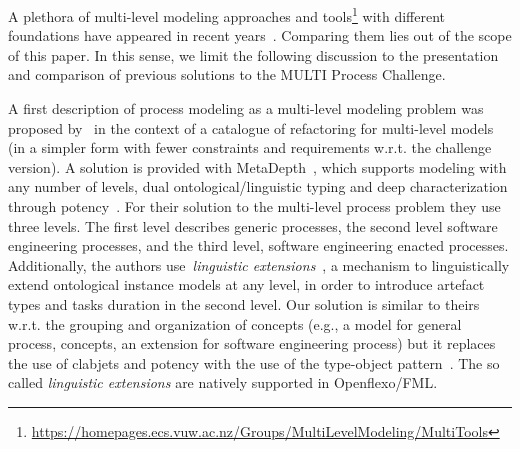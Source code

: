 



A plethora of multi-level modeling approaches and tools\footnote{\url{https://homepages.ecs.vuw.ac.nz/Groups/MultiLevelModeling/MultiTools}} with different foundations have appeared in recent years~\citep{somogyi2021playground}. Comparing them lies out of the scope of this paper. In this sense, we limit the following discussion to the presentation and comparison of previous solutions to the MULTI Process Challenge.

A first description of process modeling as a multi-level modeling problem was proposed by~\citet{lara2018refactoring} in the context of a catalogue of refactoring for multi-level models (in a simpler form with fewer constraints and requirements w.r.t. the challenge version). A solution is provided with MetaDepth~\parencite{metadepth}, which supports modeling with any number of levels, dual ontological/linguistic typing and deep characterization through potency~\citep{potency}. For their solution to the multi-level process problem they use three levels. The first level describes generic processes, the second level software engineering processes, and the third level, software engineering enacted processes. Additionally, the authors use~\emph{linguistic extensions}~\citep{metadepth}, a mechanism to  linguistically extend ontological instance models at any level, in order to introduce artefact types and tasks duration in the second level. Our solution is similar to theirs w.r.t. the grouping and organization of concepts (e.g., a model for general process, concepts, an extension for software engineering process) but it replaces the use of clabjets and potency with the use of the type-object pattern~\citep{typeObject}. The so called \emph{linguistic extensions} are natively supported in Openflexo/FML.



